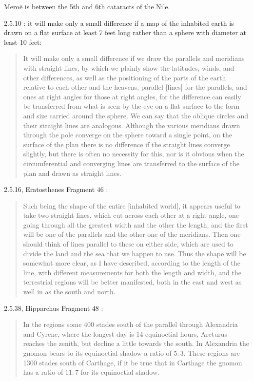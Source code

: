 \documentclass{article}
\theoremstyle{definition}
\begin{document}
Mero\"e is between the 5th and 6th cataracts of the Nile. 


2.5.10  \cite[p.~134]{strabo}: it will make only a small difference if a map of the inhabited earth is drawn on a flat surface at least 7 feet long rather than a sphere with diameter at least 10 feet:

\begin{quote}
It will make only a small difference if we draw the parallels and meridians with straight lines, by which we plainly show the latitudes, winds, and other differences, as well
as the positioning of the parts of the earth relative to each other and the heavens, parallel [lines] for the parallels, and ones at right angles for those at right
angles, for the difference can easily be transferred from what is seen by the eye on a flat surface to the form and size carried around the sphere. We can say that the oblique
circles and their straight lines are analogous. Although the various meridians drawn through the pole converge on the sphere toward a single point, on the surface of the plan
there is no difference if the straight lines converge slightly, but there is often no necessity for this, nor is it obvious when the circumferential and converging lines are 
transferred to the surface of the plan and drawn as straight lines.
\end{quote}

2.5.16, Eratosthenes Fragment 46 \cite[p.~69]{eratosthenes}:

\begin{quote}
Such being the shape of the entire [inhabited world], it appears useful
to take two straight lines, which cut across each other at a right angle,
one going through all the greatest width and the other the length, and
the first will be one of the parallels and the other one of the meridians.
Then one should think of lines parallel to these on either side, which are
used to divide the land and the sea that we happen to use. Thus the
shape will be somewhat more clear, as I have described, according to the
length of the line, with different measurements for both the length and
width, and the terrestrial regions will be better manifested, both in the
east and west as well in as the south and north.
\end{quote}

2.5.38, Hipparchus Fragment 48 \cite[p.~95]{dicks}:

\begin{quote}
In the regions some 400 stades south of the parallel through
Alexandria and Cyrene, where the longest day is 14 equinoctial
hours, Arcturus reaches the zenith, but decline a little towards
the south. In Alexandria the gnomon bears to its equinoctial
shadow a ratio of $5:3$. These regions are 1300 stades south of
Carthage, if it be true that in Carthage the gnomon has a ratio
of $11:7$ for its equinoctial shadow.
\end{quote}
\end{document}
